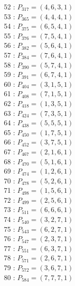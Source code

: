 \documentclass{article}
\begin{document}
{\begin{multicols}{3}
52 : $P_{317}=( 4, 6, 3, 1 )$\\
53 : $P_{365}=( 4, 4, 4, 1 )$\\
54 : $P_{375}=( 6, 5, 4, 1 )$\\
55 : $P_{376}=( 7, 5, 4, 1 )$\\
56 : $P_{382}=( 5, 6, 4, 1 )$\\
57 : $P_{384}=( 7, 6, 4, 1 )$\\
58 : $P_{390}=( 5, 7, 4, 1 )$\\
59 : $P_{391}=( 6, 7, 4, 1 )$\\
60 : $P_{404}=( 3, 1, 5, 1 )$\\
61 : $P_{408}=( 7, 1, 5, 1 )$\\
62 : $P_{418}=( 1, 3, 5, 1 )$\\
63 : $P_{424}=( 7, 3, 5, 1 )$\\
64 : $P_{438}=( 5, 5, 5, 1 )$\\
65 : $P_{450}=( 1, 7, 5, 1 )$\\
66 : $P_{452}=( 3, 7, 5, 1 )$\\
67 : $P_{467}=( 2, 1, 6, 1 )$\\
68 : $P_{470}=( 5, 1, 6, 1 )$\\
69 : $P_{474}=( 1, 2, 6, 1 )$\\
70 : $P_{478}=( 5, 2, 6, 1 )$\\
71 : $P_{498}=( 1, 5, 6, 1 )$\\
72 : $P_{499}=( 2, 5, 6, 1 )$\\
73 : $P_{511}=( 6, 6, 6, 1 )$\\
74 : $P_{540}=( 3, 2, 7, 1 )$\\
75 : $P_{543}=( 6, 2, 7, 1 )$\\
76 : $P_{547}=( 2, 3, 7, 1 )$\\
77 : $P_{551}=( 6, 3, 7, 1 )$\\
78 : $P_{571}=( 2, 6, 7, 1 )$\\
79 : $P_{572}=( 3, 6, 7, 1 )$\\
80 : $P_{584}=( 7, 7, 7, 1 )$\\
\end{multicols}


%


%


}%
\end{document}
